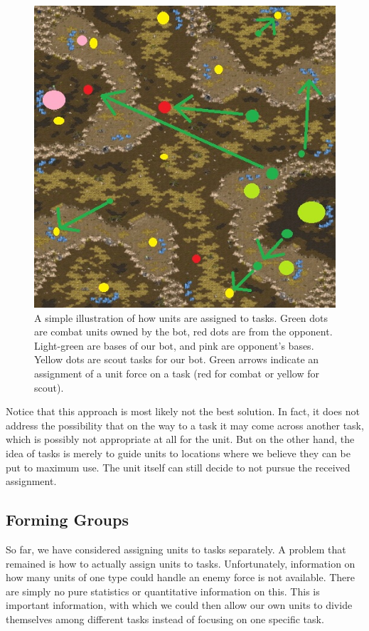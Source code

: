 \begin{figure}
\centering
\includegraphics[scale=0.4]{mapassign5.jpg}
\caption{\label{fig:mapassign} A simple illustration of how units are assigned to tasks. Green dots are combat units owned by the bot, red dots are from the opponent. Light-green are bases of our bot, and pink are opponent's bases. Yellow dots are scout tasks for our bot. Green arrows indicate an assignment of a unit force on a task (red for combat or yellow for scout).}
\end{figure}

Notice that this approach is most likely not the best solution. In fact, it does not address the possibility that on the way to a task it may come across another task, which is possibly not appropriate at all for the unit. But on the other hand, the idea of tasks is merely to guide units to locations where we believe they can be put to maximum use. The unit itself can still decide to not pursue the received assignment.


\subsection{Forming Groups}
So far, we have considered assigning units to tasks separately. A problem that remained is how to actually assign units to tasks. Unfortunately, information on how many units of one type could handle an enemy force is not available. There are simply no pure statistics or quantitative information on this. This is important information, with which we could then allow our own units to divide themselves among different tasks instead of focusing on one specific task. 

